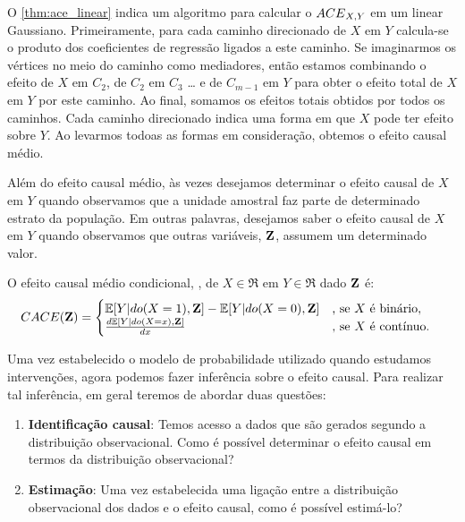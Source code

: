 O \cref{thm:ace_linear} indica um algoritmo 
para calcular o ${ACE}_{X,Y}$ em um \CM linear Gaussiano.
Primeiramente, para cada caminho direcionado 
de $X$ em $Y$ calcula-se 
o produto dos coeficientes de regressão ligados a este caminho.
Se imaginarmos os vértices no meio do caminho como mediadores, então 
estamos combinando o efeito de $X$ em $C_{2}$, de $C_{2}$ em $C_{3}$ \ldots
e de $C_{m-1}$ em $Y$ para obter
o efeito total de $X$ em $Y$ por este caminho.
Ao final, somamos os efeitos totais obtidos por todos os caminhos.
Cada caminho direcionado indica uma forma em que $X$ pode ter efeito sobre $Y$.
Ao levarmos todoas as formas em consideração, 
obtemos o efeito causal médio.

Além do efeito causal médio, 
às vezes desejamos determinar 
o efeito causal de $X$ em $Y$ quando
observamos que a unidade amostral
faz parte de determinado estrato da população.
Em outras palavras, desejamos saber 
o efeito causal de $X$ em $Y$ quando observamos que
outras variáveis, ${\mathbf{Z}}$, assumem um determinado valor.

\begin{definition}
 \label{def:cace}
 O efeito causal médio condicional, \CACE,
 de $X \in \Re$ em $Y \in \Re$ dado ${\mathbf{Z}}$ é:
 \begin{align*}
  {CACE}({\mathbf{Z}}) &=
  \begin{cases}
   {\mathbb E}[Y|do(X=1),{\mathbf{Z}}] - {\mathbb E}[Y|do(X=0),{\mathbf{Z}}]
   & \text{, se $X$ é binário}, \\
   \frac{d{\mathbb E}[Y|do(X=x),{\mathbf{Z}}]}{dx}
   & \text{, se $X$ é contínuo}.
  \end{cases}
 \end{align*}
\end{definition}

Uma vez estabelecido o modelo de probabilidade
utilizado quando estudamos intervenções,
agora podemos fazer inferência sobre o efeito causal.
Para realizar tal inferência, 
em geral teremos de abordar duas questões:

\begin{enumerate}
 \item \textbf{Identificação causal}: Temos acesso a dados que 
 são gerados segundo a distribuição observacional.
 Como é possível determinar o efeito causal
 em termos da distribuição observacional?
 
 \item \textbf{Estimação}: Uma vez estabelecida 
 uma ligação entre a distribuição observacional dos dados e
 o efeito causal, como é possível estimá-lo?
\end{enumerate}


